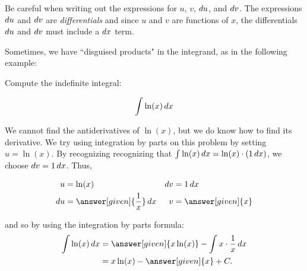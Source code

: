 \documentclass{ximera}
\begin{document}
\begin{warning}
Be careful when writing out the expressions for $u$, $v$, $\mathop{}\!d u$, and $\mathop{}\!d v$.  The expressions $\mathop{}\!d u$ and $\mathop{}\!d v$ are \emph{differentials} and since $u$ and $v$ are functions of $x$, the differentials $\mathop{}\!d u$ and $\mathop{}\!d v$ must include a $\mathop{}\!d x$ term.
\end{warning}

Sometimes, we have ``disguised products" in the integrand, as in the following example:

\begin{example}
Compute the indefinite integral:

\[
\int \ln(x)\mathop{}\!d x
\]
\begin{explanation}
We cannot find the antiderivatives of $\ln(x)$, but we do know how to find its derivative.  We try using integration by parts on this problem by setting $u=\ln(x)$.  By recognizing recognizing that $\int \ln(x) \mathop{}\!d x = \ln(x) \cdot (1 \mathop{}\!d x)$, we choose $\mathop{}\!d v = 1 \mathop{}\!d x$.  Thus,

\begin{align*}
u &= \ln(x) & \d v & =1 \d x \\
 \d u &= \answer[given]{\frac{1}{x}} \d x & v&= \answer[given]{x}
\end{align*}

and so by using the integration by parts formula:
\begin{align*}
 \int \ln(x)\d x&=\answer[given]{x \ln(x)}-\int x \cdot \frac{1}{x}\d x\\
&= x\ln (x)- \answer[given]{x}+C.\\
\end{align*}
\end{explanation}
\end{example}
\end{document}
